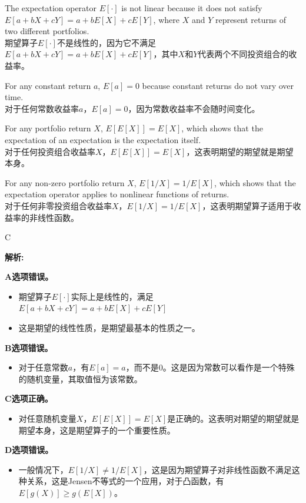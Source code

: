 \documentclass{article}
\newenvironment{explanation}
{\textbf{解析:}\par}
{\par}
\begin{document}
\begin{choices}
    \item The expectation operator \(E[\cdot]\) is not linear because it does not satisfy \(E[a + bX + cY] = a + bE[X] + cE[Y]\), where \(X\) and \(Y\) represent returns of two different portfolios.\\
    期望算子\(E[\cdot]\)不是线性的，因为它不满足\(E[a + bX + cY] = a + bE[X] + cE[Y]\)，其中\(X\)和\(Y\)代表两个不同投资组合的收益率。
    \item For any constant return \(a\), \(E[a] = 0\) because constant returns do not vary over time.\\
    对于任何常数收益率\(a\)，\(E[a] = 0\)，因为常数收益率不会随时间变化。
    \item For any portfolio return \(X\), \(E[E[X]] = E[X]\), which shows that the expectation of an expectation is the expectation itself.\\
    对于任何投资组合收益率\(X\)，\(E[E[X]] = E[X]\)，这表明期望的期望就是期望本身。
    \item For any non-zero portfolio return \(X\), \(E[1/X] = 1/E[X]\), which shows that the expectation operator applies to nonlinear functions of returns.\\
    对于任何非零投资组合收益率\(X\)，\(E[1/X] = 1/E[X]\)，这表明期望算子适用于收益率的非线性函数。
\end{choices}


\begin{correctanswer}
    C
\end{correctanswer}

\begin{explanation}
\textbf{A选项错误。}
\begin{itemize}
    \item 期望算子\(E[\cdot]\)实际上是线性的，满足\(E[a + bX + cY] = a + bE[X] + cE[Y]\)
    \item 这是期望的线性性质，是期望最基本的性质之一。
\end{itemize}

\textbf{B选项错误。}
\begin{itemize}
    \item 对于任意常数\(a\)，有\(E[a] = a\)，而不是0。这是因为常数可以看作是一个特殊的随机变量，其取值恒为该常数。
\end{itemize}

\textbf{C选项正确。}
\begin{itemize}
    \item 对任意随机变量\(X\)，\(E[E[X]] = E[X]\)是正确的。这表明对期望的期望就是期望本身，这是期望算子的一个重要性质。
\end{itemize}

\textbf{D选项错误。}
\begin{itemize}
    \item 一般情况下，\(E[1/X] \neq 1/E[X]\)，这是因为期望算子对非线性函数不满足这种关系，这是Jensen不等式的一个应用，对于凸函数，有\(E[g(X)] \geq g(E[X])\)。
\end{itemize}
\end{explanation}
\end{document}
